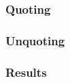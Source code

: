 \subsubsection{Quoting}\label{sec:prototype-quoting}



\subsubsection{Unquoting}

\subsubsection{Results}

